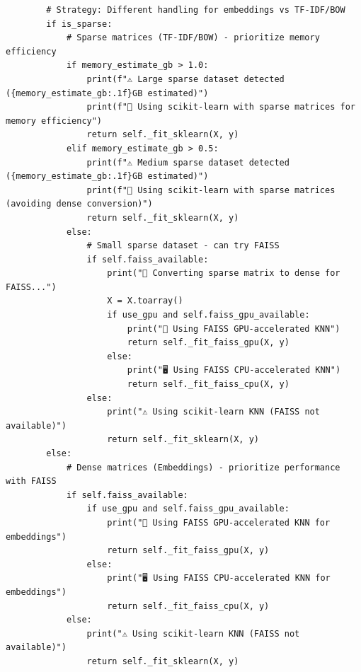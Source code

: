 \begin{verbatim}
        # Strategy: Different handling for embeddings vs TF-IDF/BOW
        if is_sparse:
            # Sparse matrices (TF-IDF/BOW) - prioritize memory efficiency
            if memory_estimate_gb > 1.0:
                print(f"⚠️ Large sparse dataset detected ({memory_estimate_gb:.1f}GB estimated)")
                print(f"🔄 Using scikit-learn with sparse matrices for memory efficiency")
                return self._fit_sklearn(X, y)
            elif memory_estimate_gb > 0.5:
                print(f"⚠️ Medium sparse dataset detected ({memory_estimate_gb:.1f}GB estimated)")
                print(f"🔄 Using scikit-learn with sparse matrices (avoiding dense conversion)")
                return self._fit_sklearn(X, y)
            else:
                # Small sparse dataset - can try FAISS
                if self.faiss_available:
                    print("🔄 Converting sparse matrix to dense for FAISS...")
                    X = X.toarray()
                    if use_gpu and self.faiss_gpu_available:
                        print("🚀 Using FAISS GPU-accelerated KNN")
                        return self._fit_faiss_gpu(X, y)
                    else:
                        print("🖥️ Using FAISS CPU-accelerated KNN")
                        return self._fit_faiss_cpu(X, y)
                else:
                    print("⚠️ Using scikit-learn KNN (FAISS not available)")
                    return self._fit_sklearn(X, y)
        else:
            # Dense matrices (Embeddings) - prioritize performance with FAISS
            if self.faiss_available:
                if use_gpu and self.faiss_gpu_available:
                    print("🚀 Using FAISS GPU-accelerated KNN for embeddings")
                    return self._fit_faiss_gpu(X, y)
                else:
                    print("🖥️ Using FAISS CPU-accelerated KNN for embeddings")
                    return self._fit_faiss_cpu(X, y)
            else:
                print("⚠️ Using scikit-learn KNN (FAISS not available)")
                return self._fit_sklearn(X, y)
\end{verbatim}

